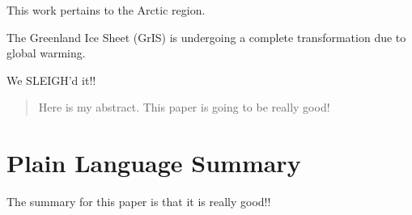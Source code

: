 \documentclass{agujournal2019}
\begin{document}



\begin{keypoints}
\item This work pertains to the Arctic region.
\item The Greenland Ice Sheet (GrIS) is undergoing a complete transformation due to global warming.
\item We SLEIGH'd it!!
\end{keypoints}

%
%

%
%


\begin{abstract}
Here is my abstract. This paper is going to be really good!
\end{abstract}

\section*{Plain Language Summary}
The summary for this paper is that it is really good!!
\end{document}
